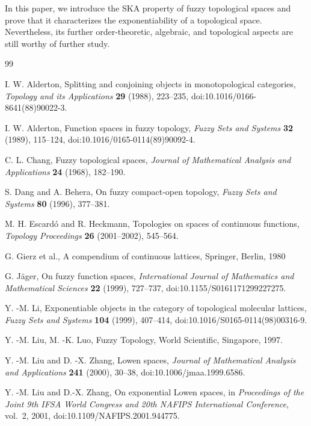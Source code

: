 \documentclass[11pt,a4paper]{article}
\numberwithin{equation}{section}
\theoremstyle{definition}
\theoremstyle{remark}
\begin{document}
In this paper, we introduce the SKA property of fuzzy topological spaces and prove that it characterizes the exponentiability of a topological space. Nevertheless, its further order-theoretic, algebraic, and topological aspects are still worthy of further study.

\begin{thebibliography}{99}

I. W. Alderton,
Splitting and conjoining objects in monotopological categories,
\emph{Topology and its Applications}
\textbf{29} (1988), 223--235,
doi:10.1016/0166-8641(88)90022-3.

I. W. Alderton,
Function spaces in fuzzy topology,
\emph{Fuzzy Sets and Systems}
\textbf{32} (1989), 115--124,
doi:10.1016/0165-0114(89)90092-4.

C. L. Chang,
Fuzzy topological spaces,
\emph{Journal of Mathematical Analysis and Applications}
\textbf{24} (1968), 182--190.

S. Dang and A. Behera,
On fuzzy compact-open topology,
\emph{Fuzzy Sets and Systems}
\textbf{80} (1996), 377--381.

M. H. Escard\'o and R. Heckmann,
Topologies on spaces of continuous functions,
\emph{Topology Proceedings}
\textbf{26} (2001--2002), 545--564.

G. Gierz et al., A compendium of continuous lattices,
Springer, Berlin, 1980

G. J\"ager,
On fuzzy function spaces,
\emph{International Journal of Mathematics and Mathematical Sciences}
\textbf{22} (1999), 727--737,
doi:10.1155/S0161171299227275.

Y. -M. Li,
Exponentiable objects in the category of topological molecular lattices,
\emph{Fuzzy Sets and Systems}
\textbf{104} (1999), 407--414,
doi:10.1016/S0165-0114(98)00316-9.

Y. -M. Liu, M. -K. Luo, Fuzzy Topology, World Scientific, Singapore, 1997.

Y. -M. Liu and D. -X. Zhang,
Lowen spaces,
\emph{Journal of Mathematical Analysis and Applications}
\textbf{241} (2000), 30--38,
doi:10.1006/jmaa.1999.6586.

Y. -M. Liu and D.-X. Zhang,
On exponential Lowen spaces,
in \emph{Proceedings of the Joint 9th IFSA World Congress and
20th NAFIPS International Conference}, vol.~2, 2001,
doi:10.1109/NAFIPS.2001.944775.


\end{thebibliography}
\end{document}
